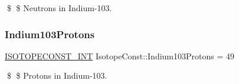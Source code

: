 \$ \$ Neutrons in Indium-\/103. \mbox{\label{group___isotope_const-_indium-_in103_ga9c45d312f015a65ab221e226ef3b8942}} 
\subsubsection{\texorpdfstring{Indium103\+Protons}{Indium103Protons}}
{\footnotesize\ttfamily \mbox{\hyperlink{group___isotope_const-_macros_ga5f18360b3e99483a35c32d789e62621c}{I\+S\+O\+T\+O\+P\+E\+C\+O\+N\+S\+T\+\_\+\+I\+NT}} Isotope\+Const\+::\+Indium103\+Protons = 49}

\$ \$ Protons in Indium-\/103. 